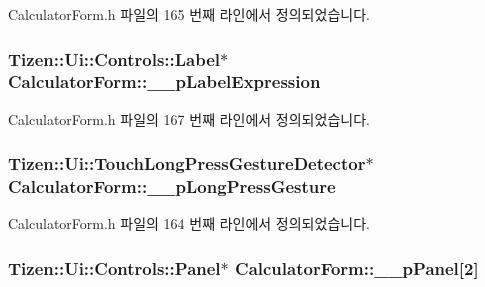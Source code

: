 Calculator\+Form.\+h 파일의 165 번째 라인에서 정의되었습니다.

\hypertarget{class_calculator_form_a85c791f34a8b69e7d22b7d64d7f69bac}{
\subsubsection[{\+\_\+\+\_\+p\+Label\+Expression}]{\setlength{\rightskip}{0pt plus 5cm}Tizen\+::\+Ui\+::\+Controls\+::\+Label$\ast$ Calculator\+Form\+::\+\_\+\+\_\+p\+Label\+Expression\hspace{0.3cm}{\ttfamily [protected]}}}\label{class_calculator_form_a85c791f34a8b69e7d22b7d64d7f69bac}


Calculator\+Form.\+h 파일의 167 번째 라인에서 정의되었습니다.

\hypertarget{class_calculator_form_ae2c4d24712fa767d536ffc901810bff3}{
\subsubsection[{\+\_\+\+\_\+p\+Long\+Press\+Gesture}]{\setlength{\rightskip}{0pt plus 5cm}Tizen\+::\+Ui\+::\+Touch\+Long\+Press\+Gesture\+Detector$\ast$ Calculator\+Form\+::\+\_\+\+\_\+p\+Long\+Press\+Gesture\hspace{0.3cm}{\ttfamily [protected]}}}\label{class_calculator_form_ae2c4d24712fa767d536ffc901810bff3}


Calculator\+Form.\+h 파일의 164 번째 라인에서 정의되었습니다.

\hypertarget{class_calculator_form_ae930aeea4ccaf0fd752c11350c6e2af6}{
\subsubsection[{\+\_\+\+\_\+p\+Panel}]{\setlength{\rightskip}{0pt plus 5cm}Tizen\+::\+Ui\+::\+Controls\+::\+Panel$\ast$ Calculator\+Form\+::\+\_\+\+\_\+p\+Panel\mbox{[}2\mbox{]}\hspace{0.3cm}{\ttfamily [protected]}}}\label{class_calculator_form_ae930aeea4ccaf0fd752c11350c6e2af6}


